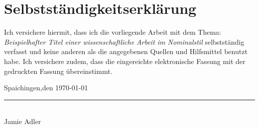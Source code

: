 \documentclass[12pt,a4paper,oneside]{article} %
\newcommand{\source}[1]{\par\vspace{2pt}\noindent\footnotesize Quelle: #1}
\newcommand{\ownsource}{\source{Eigene Darstellung}}
\begin{document}

\newpage
{} %
\printbibliography[heading=bibintoc, title=Literaturverzeichnis] %

\newpage
\section*{Selbstständigkeitserklärung}

\noindent
Ich versichere hiermit, dass ich die vorliegende Arbeit mit dem Thema: \textit{Beispielhafter Titel einer wissenschaftliche Arbeit im Nominalstil} selbstständig verfasst und keine anderen als die angegebenen Quellen und Hilfsmittel benutzt habe. Ich versichere zudem, dass die eingereichte elektronische Fassung mit der gedruckten Fassung übereinstimmt.

\vspace{2cm}
\noindent
Spaichingen,den \today
\hfill %
\begin{minipage}[t]{5cm} %
    \centering %
    \rule{\linewidth}{0.4pt}\\[1ex] %
    Jamie Adler
\end{minipage}
\end{document}
